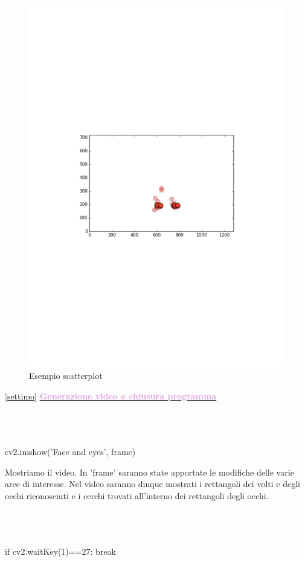 \documentclass[12pt]{article}
\begin{document}
{\begin{figure}[htbp]
\centering
\includegraphics{scatter}
\caption{Esempio scatterplot}
\end{figure}
\vspace{1cm}


\ref {settimo} \underline{\textbf{\textcolor{Plum}{Generazione video e chiusura programma}}}
   \\
   \\
   \\
   \\
 \begin{codice}
    cv2.imshow('Face and eyes', frame)
\end{codice}
\vspace{1cm}
 
    Mostriamo il video. In 'frame' saranno state apportate le modifiche delle varie aree di interesse. Nel video saranno dinque mostrati i rettangoli dei volti e degli occhi riconosciuti e i cerchi trovati all'interno dei rettangoli degli occhi.
   \\
   \\
   \\
   \\
\begin{codice}
    if cv2.waitKey(1)==27:
        break


\end{codice}}
\end{document}
